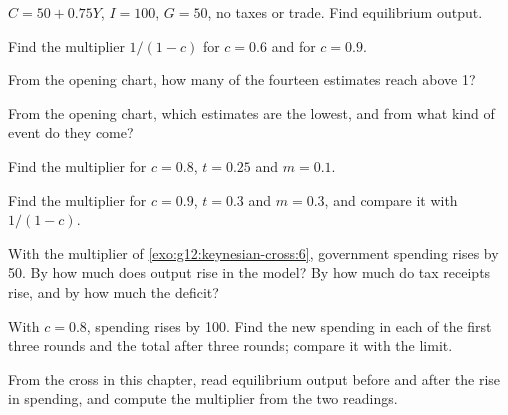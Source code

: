\begin{exercise}[$\star$]\label{exo:g12:keynesian-cross:2}
$C = 50 + 0.75Y$, $I = 100$, $G = 50$, no taxes or trade. Find equilibrium output.
\end{exercise}

\begin{exercise}[$\star$]\label{exo:g12:keynesian-cross:3}
Find the multiplier $1/(1 - c)$ for $c = 0.6$ and for $c = 0.9$.
\end{exercise}

\begin{exercise}[$\star$]\label{exo:g12:keynesian-cross:4}
From the opening chart, how many of the fourteen estimates reach above 1?
\end{exercise}

\begin{exercise}[$\star$]\label{exo:g12:keynesian-cross:5}
From the opening chart, which estimates are the lowest, and from what kind of event do they come?
\end{exercise}

\begin{exercise}[$\star\star$]\label{exo:g12:keynesian-cross:6}
Find the multiplier for $c = 0.8$, $t = 0.25$ and $m = 0.1$.
\end{exercise}

\begin{exercise}[$\star\star$]\label{exo:g12:keynesian-cross:7}
Find the multiplier for $c = 0.9$, $t = 0.3$ and $m = 0.3$, and compare it with $1/(1 - c)$.
\end{exercise}

\begin{exercise}[$\star\star$]\label{exo:g12:keynesian-cross:8}
With the multiplier of \cref{exo:g12:keynesian-cross:6}, government spending rises by 50. By how much does output rise in the model? By how much do tax receipts rise, and
by how much the deficit?
\end{exercise}

\begin{exercise}[$\star\star$]\label{exo:g12:keynesian-cross:9}
With $c = 0.8$, spending rises by 100. Find the new spending in each of the first three rounds and the total after three rounds; compare it with the limit.
\end{exercise}

\begin{exercise}[$\star\star$]\label{exo:g12:keynesian-cross:10}
From the cross in this chapter, read equilibrium output before and after the rise in spending, and compute the multiplier from the two readings.
\end{exercise}

